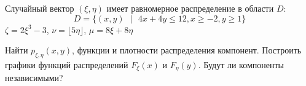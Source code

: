 
\renewcommand*{\proofname}{Решение}

Случайный вектор $(\xi,\eta)$ имеет равномерное распределение в области $D$:
\[
D = \{(x,y)\text{ }|\text{ }4x + 4y \le 12, x \ge -2, y \ge 1\}
\]
$\zeta = 2\xi^3 - 3$, $\nu = \lfloor 5\eta\rfloor$, $\mu = 8\xi + 8\eta$

\begin{problem}
Найти $p_{\xi,\eta}(x,y)$, функции и плотности распределения компонент. Построить графики функций распределений $F_{\xi}(x)$ и $F_{\eta}(y)$. Будут ли компоненты независимыми?
\end{problem}

